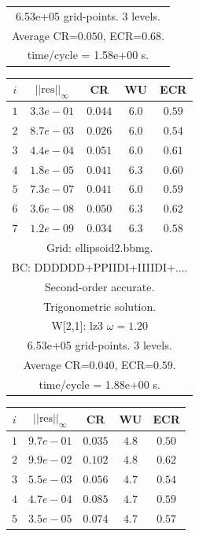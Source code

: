 \begin{table}[hbt]
\begin{center}
{\begin{tabular}{|c|c|c|c|c|}
\multicolumn{5}{|c|}{6.53e+05 grid-points. 3 levels.}  \\
\multicolumn{5}{|c|}{Average CR=$0.050$, ECR=$0.68$.}  \\
\multicolumn{5}{|c|}{time/cycle = 1.58e+00 s.}  \\
\hline 
\end{tabular}
\begin{tabular}{|c|c|c|c|c|} \hline 
 $i$   & $\vert\vert\mbox{res}\vert\vert_\infty$  &  CR     &  WU    & ECR  \\   \hline 
 $ 1$  & $ 3.3e-01$ & $0.044$ & $ 6.0$ & $0.59$ \\ 
 $ 2$  & $ 8.7e-03$ & $0.026$ & $ 6.0$ & $0.54$ \\ 
 $ 3$  & $ 4.4e-04$ & $0.051$ & $ 6.0$ & $0.61$ \\ 
 $ 4$  & $ 1.8e-05$ & $0.041$ & $ 6.3$ & $0.60$ \\ 
 $ 5$  & $ 7.3e-07$ & $0.041$ & $ 6.0$ & $0.59$ \\ 
 $ 6$  & $ 3.6e-08$ & $0.050$ & $ 6.3$ & $0.62$ \\ 
 $ 7$  & $ 1.2e-09$ & $0.034$ & $ 6.3$ & $0.58$ \\ 
\hline 
\multicolumn{5}{|c|}{Grid: ellipsoid2.bbmg.}  \\
\multicolumn{5}{|c|}{BC: DDDDDD+PPIIDI+IIIIDI+....}  \\
\multicolumn{5}{|c|}{Second-order accurate.}  \\
\multicolumn{5}{|c|}{Trigonometric solution.}  \\
\multicolumn{5}{|c|}{W[2,1]: lz3 $\omega=1.20$}  \\
\multicolumn{5}{|c|}{6.53e+05 grid-points. 3 levels.}  \\
\multicolumn{5}{|c|}{Average CR=$0.040$, ECR=$0.59$.}  \\
\multicolumn{5}{|c|}{time/cycle = 1.88e+00 s.}  \\
\hline 
\end{tabular}
\begin{tabular}{|c|c|c|c|c|} \hline 
 $i$   & $\vert\vert\mbox{res}\vert\vert_\infty$  &  CR     &  WU    & ECR  \\   \hline 
 $ 1$  & $ 9.7e-01$ & $0.035$ & $ 4.8$ & $0.50$ \\ 
 $ 2$  & $ 9.9e-02$ & $0.102$ & $ 4.8$ & $0.62$ \\ 
 $ 3$  & $ 5.5e-03$ & $0.056$ & $ 4.7$ & $0.54$ \\ 
 $ 4$  & $ 4.7e-04$ & $0.085$ & $ 4.7$ & $0.59$ \\ 
 $ 5$  & $ 3.5e-05$ & $0.074$ & $ 4.7$ & $0.57$ \\ 

\end{tabular}}
\end{center}
\end{table}
